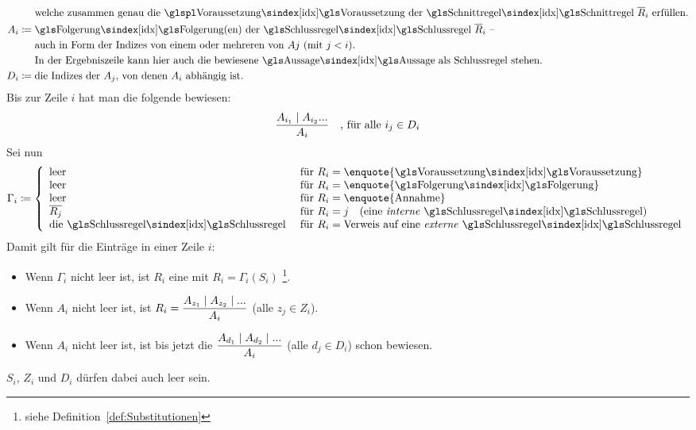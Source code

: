 {\begin{align}
	& \quad\;\; \text{welche zusammen genau die \glsIdxPl{Voraussetzung} der \glsIdx{Schnittregel} } \overline{R}_i \text{ erfüllen.}
	\\
	A_i & \defeq \text{\glsIdx{Folgerung}(en) der \glsIdx{Schlussregel} $\overline{R}_i$ --}\\
	& \quad\;\; \text{auch in Form der Indizes von einem oder mehreren von $Aj$ (mit $j < i$).}\\
	& \quad\;\; \text{In der Ergebniszeile kann hier auch die bewiesene \glsIdx{Aussage} als Schlussregel stehen.}
	\\
	D_i & \defeq \text{die Indizes der $A_j$, von denen $A_i$ abhängig ist.}
\end{align}
Bis zur Zeile $i$ hat man die folgende  bewiesen:
\[ \frac{A_{i_1} \mid A_{i_2} ...}{A_i} \quad \text{, für alle } i_j \in D_i \]
Sei nun
\[
	\Gamma_i \defeq
	\left\{
		\begin{array}{ll}
			\text{leer}    & \text{ für } R_i = \text{\enquote{\glsIdx{Voraussetzung}}} \\
			\text{leer}    & \text{ für } R_i = \text{\enquote{\glsIdx{Folgerung}}}     \\
			\text{leer}    & \text{ für } R_i = \text{\enquote{Annahme}}       \\
			\overline{R_j} & \text{ für } R_i = j \quad \text{(eine \emph{interne} \glsIdx{Schlussregel})} \\
			\text{die \glsIdx{Schlussregel}} & \text{ für } R_i = \text{Verweis auf eine \emph{externe} \glsIdx{Schlussregel}}
		\end{array}
	\right.
\]
Damit gilt für die Einträge in einer Zeile $i$:
\begin{itemize}
	\item Wenn $\Gamma_i$ nicht leer ist, ist $R_i$ eine  mit $R_i = \Gamma_i(S_i)$%
	\footnote{%
		siehe Definition~\eqref{def:Substitutionen} %
	}.
	\item Wenn $A_i$ nicht leer ist, ist $R_i = \dfrac{A_{z_1} \mid A_{z_2} \mid ...}{A_i}$ (alle $z_j \in Z_i$).
	\item Wenn $A_i$ nicht leer ist, ist bis jetzt die  $\dfrac{A_{d_1} \mid A_{d_2} \mid ...}{A_i}$ (alle $d_j \in D_i$) schon bewiesen.
\end{itemize}
$S_i$, $Z_i$ und $D_i$ dürfen dabei auch leer sein.

}
